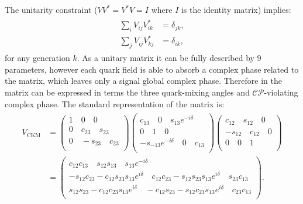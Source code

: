 The unitarity constraint ($VV^{*}=V^{*}V=I$ where $I$ is the identity matrix) implies:
\begin{align}\label{eq:unitarity}
    \begin{split}
    \sum_i V_{ij} V_{ik}^* &= \delta_{jk},\\
    \sum_j V_{ij} V_{kj}^* &= \delta_{ik},
    \end{split}
\end{align}
for any generation $k$.
As a unitary matrix it can be fully described by 9 parameters, however each quark field is able to absorb a complex phase related to the matrix,
which leaves only a signal global complex phase.
Therefore in \SM the \CKM matrix can be expressed in terms the three quark-mixing angles and $\mathcal{CP}$-violating complex phase.
The standard representation of the \CKM matrix is:
\begin{align}
    \begin{split}
    V_{\mathrm{CKM}}&=
    \begin{pmatrix}
        1 \quad 0 \quad 0\\
        0 \quad c_{23} \quad s_{23}\\
        0 \quad -s_{23} \quad c_{23}\\
    \end{pmatrix}
    \begin{pmatrix}
        c_{13} \quad 0 \quad s_{13}e^{-i\delta}\\
        0      \quad 1 \quad 0\\
        -s_{-13}e^{-i\delta} \quad 0 \quad c_{13}\\
    \end{pmatrix}
    \begin{pmatrix}
        c_{12} \quad s_{12} \quad 0\\
        -s_{12} \quad c_{12} \quad 0\\
        0 \quad 0 \quad 1\\
    \end{pmatrix}
    \\
    &=
    \begin{pmatrix}
        c_{12}c_{13} \quad s_{12}s_{13} \quad s_{13}e^{-i\delta}\\
        -s_{12}c_{23} - c_{12}s_{23}s_{13}e^{i\delta} \quad c_{12}c_{23} - s_{12}s_{23}s_{13}e^{i\delta} \quad s_{23} c_{13}\\
        s_{12}s_{23} - c_{12}c_{23} s_{13}e^{i\delta} \quad -c_{12}s_{23} - s_{12}c_{23}s_{13}e^{i\delta} \quad c_{23}c_{13}\\
    \end{pmatrix}.
    \end{split}
\end{align}
